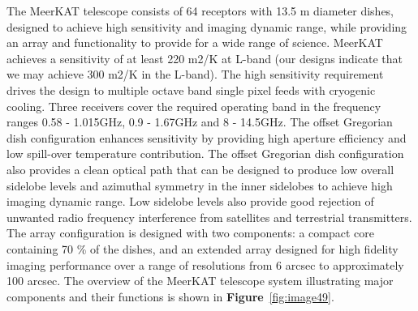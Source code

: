 





The MeerKAT telescope consists of 64 receptors with 13.5 m diameter dishes, designed to achieve high sensitivity and imaging dynamic range, while providing an array and functionality to provide for a wide range of science. 
MeerKAT achieves a sensitivity of at least 220 m2/K at L-band (our designs indicate that we may achieve 300 m2/K in the L-band).
The high sensitivity requirement drives the design to multiple octave band single pixel feeds with cryogenic cooling. Three receivers cover the required operating band in the frequency ranges 0.58 - 1.015GHz, 0.9 - 1.67GHz and 8 - 14.5GHz. 
The offset Gregorian dish configuration enhances sensitivity by providing high aperture efficiency and low spill-over temperature contribution. The offset Gregorian dish configuration also provides a clean optical path that can be designed to produce low overall sidelobe levels and azimuthal symmetry in the inner sidelobes to achieve high imaging dynamic range. 
Low sidelobe levels also provide good rejection of unwanted radio frequency interference from satellites and terrestrial transmitters. The array configuration is designed with two components: a compact core containing 70 \% of the dishes, and an extended array
designed for high fidelity imaging performance over a range of resolutions from 6 arcsec to approximately 100 arcsec. 
The overview of the MeerKAT telescope system illustrating major components and their functions  is shown in \textbf{Figure}~\ref{fig:image49}.

